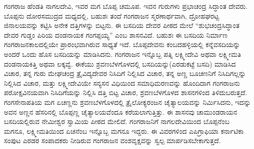 ಗಂಗರಾಜ ಹೆಂಡತಿ ನಾಗಲದೇವಿ, ಇವರ ಮಗ ಬೊಪ್ಪ ಚಮೂಪ. ಇವನ ಗುರುಗಳು ಪ್ರಭಾಚಂದ್ರ ಸಿದ್ಧಾಂತ ದೇವರು. ಬೊಪ್ಪನು ದೋರಸಮುದ್ರದ ಮಧ್ಯದಲ್ಲಿ, ಬಹುಶಃ ತಂದೆ ಗಂಗರಾಜನ ಸ್ಮರಣಾರ್ಥವಾಗಿ, ದ್ರೋಹಘರಟ್ಟ ಜಿನಾಲಯವನ್ನು ಕಟ್ಟಿಸಿ ಅನೇಕ ದತ್ತಿಗಳನ್ನು ಬಿಟ್ಟನು. ಈ ಬಸದಿಯ ದೇವರ ಪೀಠದ ಮೇಲೆ “ಶುಭಚಂದ್ರಸಿದ್ಧಾಂತ ದೇವರ ಗುಡ್ಡಂ ಪಿರಿಯ ದಂಡನಾಯಕ ಗಂಗಪ್ಪಯ್ಯ” ಎಂಬ ಶಾಸನವಿದೆ. ಬಹುಶಃ ಈ ಬಸದಿಯ ನಿರ್ಮಾಣ ಗಂಗರಾಜನಕಾಲದಲ್ಲಿಯೇ ಪ್ರಾರಂಭವಾಗಿರುವ ಸಾಧ್ಯತೆ ಇದೆ. ಬೊಪ್ಪದೇವನು ಕಂಬದಹಳ್ಳಿಯಲ್ಲಿ ಕನ್ನೆವಸದಿಯನ್ನು ಅಂದರೆ ಒಂದು ಹೊಸ ಬಸದಿಯನ್ನು ಮಾಡಿಸಿದನು. ಗಂಗರಾಜನ ಇನ್ನೊಬ್ಬ ಪತ್ನಿ ಲಕ್ಷ್ಮೀದೇವಿ ಅಥವಾ ಲಕ್ಷ್ಮೀಮತಿ ದಂಡನಾಯಕಿತ್ತಿ ಅಥವಾ ಲಕ್ಕವ್ವೆ. ಈಕೆಯು ಶ್ರವಣಬೆಳಗೊಳದಲ್ಲಿ ಬಸದಿಯನ್ನು(ಎರಡುಕಟ್ಟೆ ಬಸದಿ) ಮಾಡಿಸಿದ ವಿಚಾರ, ತನ್ನ ಗುರು ಮೇಘಚಂದ್ರ ತ್ರೈವಿದ್ಯದೇವರ ನಿಸಿದಿಗೆ ನಿಲ್ಲಿಸಿದ ವಿಚಾರ, ತನ್ನ ಅಣ್ಣ ಬೂಚಣನಿಗೆ ನಿಸಿದಿಗಲ್ಲನ್ನು ನಿಲ್ಲಿಸಿದ ವಿಚಾರ, ಮತ್ತು ಲಕ್ಷ್ಮೀದೇವಿಯೇ ಸನ್ಯಸನ ವಿಧಿಯಿಂದ ಸಮಾಧಿಮರಣವನ್ನು ಹೊಂದಿದಾಗ ಗಂಗರಾಜನು ಪರೋಕ್ಷವಿನಯವಾಗಿ ನಿಸಿದಿಗೆಯನ್ನು ನಿಲ್ಲಿಸಿ ದತ್ತಿ ಬಿಟ್ಟ ವಿಚಾರ, ಶ್ರವಣಬೆಳಗೊಳದ ಶಾಸನಗಳಿಂದ ತಿಳಿದುಬರುತ್ತದೆ. ಗಂಗಸೇನಾಪತಿಯ ಮಗ ಏಚಣ್ಣನು ಶ್ರವಣಬೆಳಗೊಳದಲ್ಲಿ ತ್ರೈಲೋಕ್ಯರಂಜನ ಚೈತ್ಯಾಲಯವನ್ನು ನಿರ್ಮಿಸಿದನು, ಇದನ್ನು ಅವನ ಅಣ್ಣನ ಹೆಸರಿನಲ್ಲಿ ಬೊಪ್ಪಣ್ಣ ಚೈತ್ಯಾಲಯವೆಂದೂ ಕರೆಯಲಾಗುತ್ತಿತ್ತು. ಈ ಶಾಸನವು ಚಾಮುಂಡರಾಯನ ಬಸದಿಯಲ್ಲಿರುವ ನೇಮೀಶ್ವರ ಸ್ವಾಮಿಯ ಪೀಠದ ಮೇಲಿದೆ. ಗಂಗರಾಜನಿಗೆ ನಾಗಲದೇವಿಯಿಂದ ಬೊಪ್ಪನೆಂಬ ಮಗನೂ, ಲಕ್ಷ್ಮೀಮತಿಯಿಂದ ಏಚನೆಂಬ ಇನ್ನೊಬ್ಬ ಮಗನೂ ಇದ್ದರು. ಈ ವಿವರಗಳಿಂದ ಎಪಿಗ್ರಾಫಿಯಾ ಕರ್ನಾಟಿಕಾ ಸಂಪುಟ ಎರಡರ ಸಂಪಾದಕರು ನೀಡಿರುವ ಗಂಗರಾಜನ ವಂಶವೃಕ್ಷವನ್ನು ಸ್ವಲ್ಪ ಮಾರ್ಪಡಿಸಬೇಕಾಗುತ್ತದೆ.

